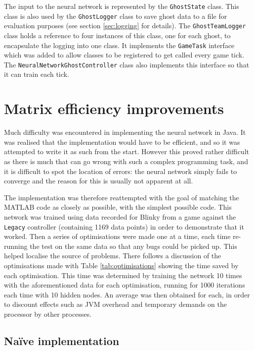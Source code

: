 The input to the neural network is represented by the {\tt GhostState} class.  This class is also used by the {\tt GhostLogger} class to save ghost data to a file for evaluation purposes (see section \ref{sec:logging} for details).  The {\tt GhostTeamLogger} class holds a reference to four instances of this class, one for each ghost, to encapsulate the logging into one class.  It implements the {\tt GameTask} interface which was added to allow classes to be registered to get called every game tick.  The {\tt NeuralNetworkGhostController} class also implements this interface so that it can train each tick.

\section{Matrix efficiency improvements}
\label{sec:efficiency}

Much difficulty was encountered in implementing the neural network in Java.  It was realised that the implementation would have to be efficient, and so it was attempted to write it as such from the start.  However this proved rather difficult as there is much that can go wrong with such a complex programming task, and it is difficult to spot the location of errors: the neural network simply fails to converge and the reason for this is usually not apparent at all.

The implementation was therefore reattempted with the goal of matching the MATLAB code as closely as possible, with the simplest possible code.  This network was trained using data recorded for Blinky from a game against the {\tt Legacy} controller (containing 1169 data points) in order to demonstrate that it worked.  Then a series of optimisations were made one at a time, each time re-running the test on the same data so that any bugs could be picked up.  This helped localise the source of problems.  There follows a discussion of the optimisations made with Table \ref{tab:optimisations} showing the time saved by each optimisation.  This time was determined by training the network 10 times with the aforementioned data for each optimisation, running for 1000 iterations each time with 10 hidden nodes.  An average was then obtained for each, in order to discount effects such as JVM overhead and temporary demands on the processor by other processes.

\subsection{Na\"{i}ve implementation}


